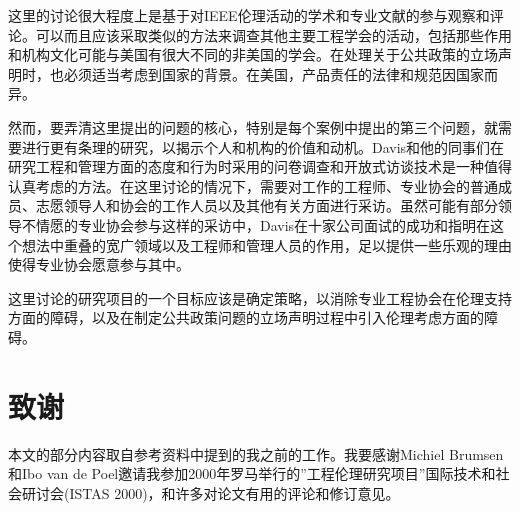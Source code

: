 \documentclass[lang=cn,11pt,a4paper]{elegantpaper}
\begin{document}
这里的讨论很大程度上是基于对IEEE伦理活动的学术和专业文献的参与观察和评论。可以而且应该采取类似的方法来调查其他主要工程学会的活动，包括那些作用和机构文化可能与美国有很大不同的非美国的学会。在处理关于公共政策的立场声明时，也必须适当考虑到国家的背景。在美国，产品责任的法律和规范因国家而异。

然而，要弄清这里提出的问题的核心，特别是每个案例中提出的第三个问题，就需要进行更有条理的研究，以揭示个人和机构的价值和动机。Davis\cite{14}和他的同事们在研究工程和管理方面的态度和行为时采用的问卷调查和开放式访谈技术是一种值得认真考虑的方法。在这里讨论的情况下，需要对工作的工程师、专业协会的普通成员、志愿领导人和协会的工作人员以及其他有关方面进行采访。虽然可能有部分领导不情愿的专业协会参与这样的采访中，Davis在十家公司面试的成功和指明在这个想法中重叠的宽广领域以及工程师和管理人员的作用，足以提供一些乐观的理由使得专业协会愿意参与其中。

这里讨论的研究项目的一个目标应该是确定策略，以消除专业工程协会在伦理支持方面的障碍，以及在制定公共政策问题的立场声明过程中引入伦理考虑方面的障碍。

\section{致谢}
本文的部分内容取自参考资料中提到的我之前的工作。我要感谢Michiel Brumsen和Ibo van de Poel邀请我参加2000年罗马举行的”工程伦理研究项目”国际技术和社会研讨会(ISTAS 2000)，和许多对论文有用的评论和修订意见。

\nocite{*}

\end{document}
